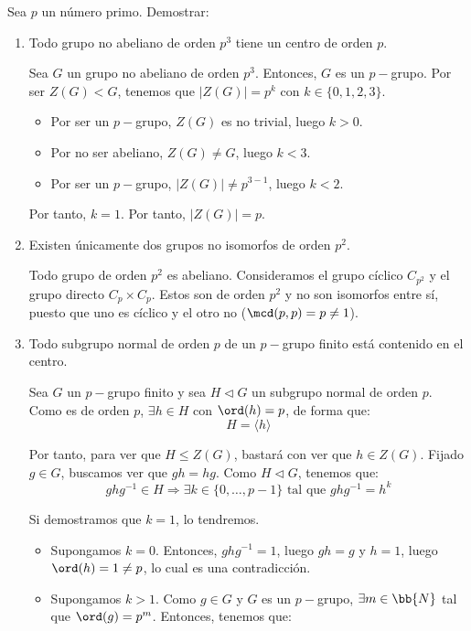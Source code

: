 \begin{ejercicio}\label{ej:6.17}
    Sea $p$ un número primo. Demostrar:
    \begin{enumerate}
        \item Todo grupo no abeliano de orden $p^3$ tiene un centro de orden $p$.
        
        Sea $G$ un grupo no abeliano de orden $p^3$. Entonces, $G$ es un $p-$grupo. Por ser $Z(G)<G$, tenemos que $|Z(G)|=p^k$ con $k\in \{0,1,2,3\}$.
        \begin{itemize}
            \item Por ser un $p-$grupo, $Z(G)$ es no trivial, luego $k>0$.
            \item Por no ser abeliano, $Z(G)\neq G$, luego $k<3$.
            \item Por ser un $p-$grupo, $|Z(G)|\neq p^{3-1}$, luego $k<2$.
        \end{itemize}
        Por tanto, $k=1$. Por tanto, $|Z(G)|=p$.
        \item Existen únicamente dos grupos no isomorfos de orden $p^2$.
        
        Todo grupo de orden $p^2$ es abeliano. Consideramos el grupo cíclico $C_{p^2}$ y el grupo directo $C_p\times C_p$. Estos son de orden $p^2$ y no son isomorfos entre sí, puesto que uno es cíclico y el otro no ($\mcd(p,p)=p\neq 1$).

        \item Todo subgrupo normal de orden $p$ de un $p-$grupo finito está contenido en el centro.
        
        Sea $G$ un $p-$grupo finito y sea $H\lhd G$ un subgrupo normal de orden $p$. Como es de orden $p$, $\exists h\in H$ con $\ord(h)=p$, de forma que:
        \begin{equation*}
            H = \langle h \rangle
        \end{equation*}

        Por tanto, para ver que $H\leq Z(G)$, bastará con ver que $h\in Z(G)$. Fijado $g\in G$, buscamos ver que $gh=hg$. Como $H\lhd G$, tenemos que:
        \begin{equation*}
            ghg^{-1} \in H
            \Longrightarrow
            \exists k\in \{0,\ldots,p-1\}\text{ tal que }ghg^{-1} = h^k
        \end{equation*}

        Si demostramos que $k=1$, lo tendremos.
        \begin{itemize}
            \item Supongamos $k=0$. Entonces, $ghg^{-1}=1$, luego $gh=g$ y $h=1$, luego $\ord(h)=1\neq p$, lo cual es una contradicción.
            \item Supongamos $k>1$. Como $g\in G$ y $G$ es un $p-$grupo, $\exists m\in \bb{N}$ tal que $\ord(g)=p^m$. Entonces, tenemos que:
        \end{itemize}

    \end{enumerate}
\end{ejercicio}


